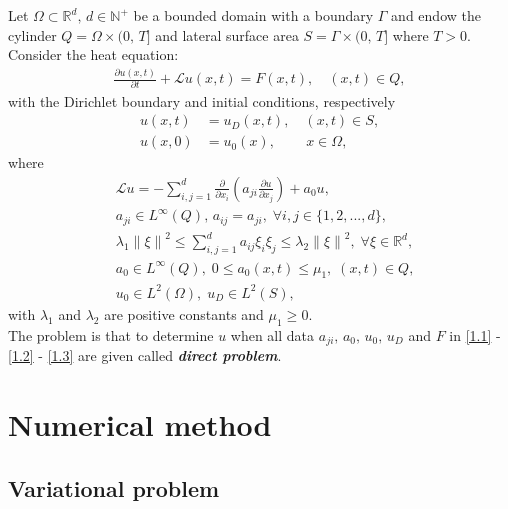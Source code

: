 \documentclass[twocolumn]{article}
\begin{document}
Let $\Omega \subset \mathbb{R}^d,\, d\in \mathbb{N^+}$ be a bounded domain with a boundary $\Gamma$ and endow the cylinder $Q=\Omega\times (0,\, T]$ and lateral surface area $S=\Gamma \times (0,\, T]$ where $T>0$. 
\\
Consider the heat equation:
\begin{align}\label{1.1}
	\frac{\partial u(x, t)}{\partial t}+\mathcal{L}u(x, t)=F(x, t), \quad(x, t)\in Q,
\end{align}
with the Dirichlet boundary and initial conditions, respectively
\begin{align}
	u(x, t)&=u_D(x, t),\quad(x, t)\in S, \label{1.2}\\
	u(x, 0)&=u_0(x),\quad\quad\, x\in \Omega,\label{1.3}
\end{align}
where
\begin{align*}
	&\mathcal{L}u = -\sum_{i, j=1}^{d}\frac{\partial}{\partial x_i}\left(a_{ji}\frac{\partial u}{\partial x_j}\right)+a_0u,\\
	&a_{ji}\in L^{\infty}(Q),\, a_{ij}=a_{ji},\; \forall i, j\in \{1, 2, ..., d\},\\
	&\lambda_1\left\|\xi\right\|^2\leq \sum_{i, j=1}^{d}a_{ij}\xi_i\xi_j\leq \lambda_2\left\|\xi\right\|^2,\; \forall \xi\in\mathbb{R}^d,\\
	&a_0\in L^{\infty}(Q),\; 0\leq a_0(x, t)\leq \mu_1,\; (x, t)\in Q,\\ 
	&u_0\in L^2(\Omega),\;u_D\in L^2(S),
\end{align*}
with $\lambda_1$ and $\lambda_2$ are positive constants and $\mu_1\geq 0$.
\\
The problem is that to determine $u$ when all data $a_{ji},\,a_0,\,u_0,\,u_D$ and $F$ in \eqref{1.1} - \eqref{1.2} - \eqref{1.3} are given called \textbf{\textit{direct problem}}. 
\section{Numerical method} 
\subsection{Variational problem}
\end{document}
